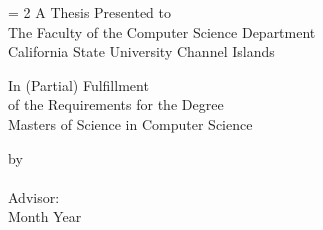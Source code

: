 \begin{titlepage}
\begin{center}
{\Large \bfseries \thesistitle \par}

\vspace{2 cm}
\baselineskip = 2\baselineskip
A Thesis Presented to \\
The Faculty of the Computer Science Department\\
California State University Channel Islands

\vspace{1 cm}

In (Partial) Fulfillment\\
of the Requirements for the Degree\\
Masters of Science in Computer Science\\

\vspace{1 cm }

\vfill

by \\
\studentname\\
Advisor: \advisorname\\
Month Year
\end{center}
\end{titlepage}